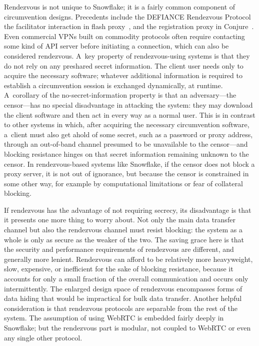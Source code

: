 \documentclass[letterpaper,twocolumn]{article}
\begin{document}
Rendezvous is not unique to Snowflake;
it is a fairly common component of circumvention designs.
Precedents include the
DEFIANCE Rendezvous Protocol~\cite[\S 3]{Lincoln2012a}
the facilitator interaction in flash proxy~\cite[\S 3]{Fifield2012a},
and the registration proxy in Conjure~\cite[\S 4.1]{Frolov2019b}.
Even commercial VPNs built on commodity protocols
often require contacting some kind of API server
before initiating a connection, which can also be considered rendezvous.
A~key property of rendezvous-using systems
is that they do not rely on any preshared secret information.
The client user needs only to acquire the necessary software;
whatever additional information is required to establish a circumvention session
is exchanged dynamically, at runtime.
A~corollary of the no-secret-information property
is that an adversary---the censor---has
no special disadvantage in attacking the system:
they may download the client software
and then act in every way as a normal user.
This is in contrast to other systems in which,
after acquiring the necessary circumvention software,
a~client must also get ahold of some secret,
such as a password or proxy address,
through an out-of-band channel
presumed to be unavailable to the censor---and
blocking resistance hinges on that secret information
remaining unknown to the censor.
In rendezvous-based systems like Snowflake,
if the censor does not block a proxy server,
it is not out of ignorance,
but because the censor is constrained in some other way,
for example by computational limitations
or fear of collateral blocking.

If rendezvous has the advantage of not requiring secrecy,
its disadvantage is that it presents one more thing to worry about.
Not only the main data transfer channel
but also the rendezvous channel must resist blocking:
the system as a whole is only as secure as the weaker of the two.
The saving grace here is that the security and performance requirements
of rendezvous are different, and generally more lenient.
Rendezvous can afford to be relatively more heavyweight,
slow, expensive, or inefficient for the sake of blocking resistance,
because it accounts for only a small fraction of the overall communication
and occurs only intermittently.
The enlarged design space of rendezvous encompasses
forms of data hiding that would be impractical
for bulk data transfer.
Another helpful consideration is that rendezvous protocols
are separable from the rest of the system.
The assumption of using WebRTC is embedded fairly deeply in Snowflake;
but the rendezvous part is modular,
not coupled to WebRTC or even any single other protocol.
\end{document}
